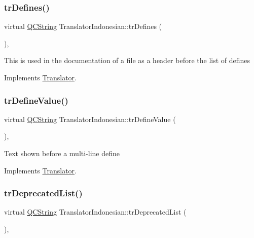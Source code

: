 \subsubsection{\texorpdfstring{trDefines()}{trDefines()}}
{\footnotesize\ttfamily virtual \mbox{\hyperlink{class_q_c_string}{Q\+C\+String}} Translator\+Indonesian\+::tr\+Defines (\begin{DoxyParamCaption}{ }\end{DoxyParamCaption})\hspace{0.3cm}{\ttfamily [inline]}, {\ttfamily [virtual]}}

This is used in the documentation of a file as a header before the list of defines 

Implements \mbox{\hyperlink{class_translator}{Translator}}.

\mbox{\label{class_translator_indonesian_aae1f227a74ee6f7a58196e7f671d302d}} 
\subsubsection{\texorpdfstring{trDefineValue()}{trDefineValue()}}
{\footnotesize\ttfamily virtual \mbox{\hyperlink{class_q_c_string}{Q\+C\+String}} Translator\+Indonesian\+::tr\+Define\+Value (\begin{DoxyParamCaption}{ }\end{DoxyParamCaption})\hspace{0.3cm}{\ttfamily [inline]}, {\ttfamily [virtual]}}

Text shown before a multi-\/line define 

Implements \mbox{\hyperlink{class_translator}{Translator}}.

\mbox{\label{class_translator_indonesian_a376b2248c0dd76d9c1c1c91b924767ad}} 
\subsubsection{\texorpdfstring{trDeprecatedList()}{trDeprecatedList()}}
{\footnotesize\ttfamily virtual \mbox{\hyperlink{class_q_c_string}{Q\+C\+String}} Translator\+Indonesian\+::tr\+Deprecated\+List (\begin{DoxyParamCaption}{ }\end{DoxyParamCaption})\hspace{0.3cm}{\ttfamily [inline]}, {\ttfamily [virtual]}}

